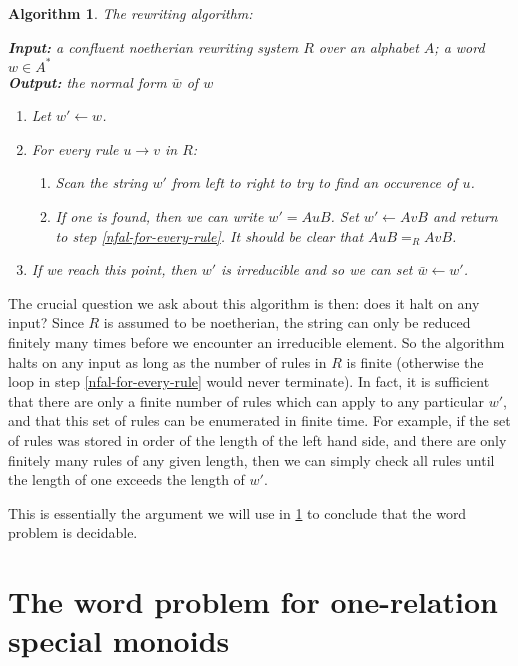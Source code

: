 \documentclass[noindex,noinsetproof,12pt]{lmaths}
\newtheorem{algorithm}[defn]{Algorithm}
\begin{document}
\begin{algorithm} The rewriting algorithm: \label{alg:rewrite}

\hspace{0.05\textwidth}
\parbox[t]{0.9\textwidth}{
	\textbf{Input:} a confluent noetherian rewriting system $R$ over an alphabet $A$; a word $w \in A^*$ \\
	\textbf{Output:} the normal form $\bar w$ of $w$
	\medskip

	\begin{enumerate}
		\item Let $w' \leftarrow w$.
		\item For every rule $u \to v$ in $R$:	\label{nfal-for-every-rule}
			\begin{enumerate}
				\item Scan the string $w'$ from left to right to try to find an occurence of $u$.
				\item If one is found, then we can write $w' = AuB$. Set $w' \leftarrow AvB$ and return to step \ref{nfal-for-every-rule}. It should be clear that $AuB =_R AvB$.
			\end{enumerate}
		\item If we reach this point, then $w'$ is irreducible and so we can set $\bar w \leftarrow w'$.
	\end{enumerate}
}
\end{algorithm}

The crucial question we ask about this algorithm is then: does it halt on any input? Since $R$ is assumed to be noetherian, the string can only be reduced finitely many times before we encounter an irreducible element. So the algorithm halts on any input as long as the number of rules in $R$ is finite (otherwise the loop in step \ref{nfal-for-every-rule} would never terminate). In fact, it is sufficient that there are only a finite number of rules which can apply to any particular $w'$, and that this set of rules can be enumerated in finite time. For example, if the set of rules was stored in order of the length of the left hand side, and there are only finitely many rules of any given length, then we can simply check all rules until the length of one exceeds the length of $w'$.

This is essentially the argument we will use in \cref{sec:special-monoids} to conclude that the word problem is decidable.

\section{The word problem for one-relation special monoids} \label{sec:special-monoids}
\end{document}
